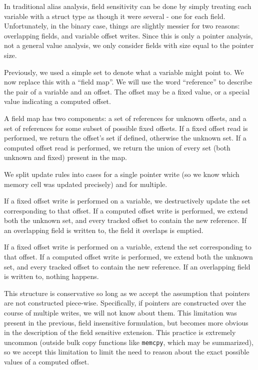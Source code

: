 In traditional alias analysis, field sensitivity can be done by simply treating each variable with a struct type as though it were several - one for each field.
Unfortunately, in the binary case, things are slightly messier for two reasons: overlapping fields, and variable offset writes.
Since this is only a pointer analysis, not a general value analysis, we only consider fields with size equal to the pointer size.

Previously, we used a simple set to denote what a variable might point to.
We now replace this with a ``field map''.
We will use the word ``reference'' to describe the pair of a variable and an offset.
The offset may be a fixed value, or a special value indicating a computed offset.

A field map has two components: a set of references for unknown offsets, and a set of references for some subset of possible fixed offsets.
If a fixed offset read is performed, we return the offset's set if defined, otherwise the unknown set.
If a computed offset read is performed, we return the union of every set (both unknown and fixed) present in the map.

We split update rules into cases for a single pointer write (so we know which memory cell was updated precisely) and for multiple.

If a fixed offset write is performed on a variable, we destructively update the set corresponding to that offset.
If a computed offset write is performed, we extend both the unknown set, and every tracked offset to contain the new reference.
If an overlapping field is written to, the field it overlaps is emptied.

If a fixed offset write is performed on a variable, extend the set corresponding to that offset.
If a computed offset write is performed, we extend both the unknown set, and every tracked offset to contain the new reference.
If an overlapping field is written to, nothing happens.

This structure is conservative so long as we accept the assumption that pointers are not constructed piece-wise.
Specifically, if pointers are constructed over the course of multiple writes, we will not know about them.
This limitation was present in the previous, field insensitive formulation, but becomes more obvious in the description of the field sensitive extension.
This practice is extremely uncommon (outside bulk copy functions like \texttt{memcpy}, which may be summarized), so we accept this limitation to limit the need to reason about the exact possible values of a computed offset.

